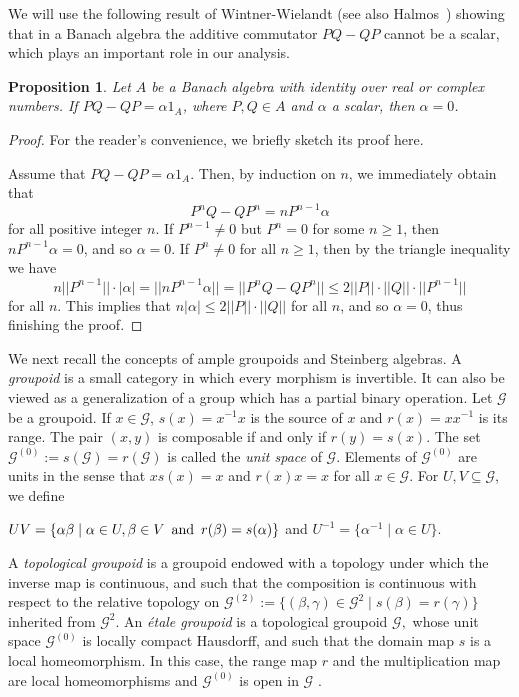 \documentclass[a4paper, 11pt, reqno]{amsart}
\newtheorem{prop}[thm]{Proposition}
\theoremstyle{definition}
\begin{document}
We will use the following result of Wintner-Wielandt \cite{Wielandt} (see also Halmos~\cite[Chapter~24]{halmos}) showing that in a Banach algebra the additive commutator $PQ-QP$ cannot be a scalar, which plays an important role in our analysis. 

\begin{prop}\label{wielandt}
Let $A$ be a Banach algebra with identity over real or complex numbers. If $PQ - QP= \alpha 1_A$, where $P,Q\in A$ and $\alpha $ a scalar, then $\alpha  = 0$. 
\end{prop}
\begin{proof}
For the reader's convenience, we briefly sketch its proof here. 

Assume that $PQ - QP= \alpha 1_A$. Then, by induction on $n$, we immediately obtain that $$P^n Q - QP^n = n P^{n-1}\alpha$$ for all positive integer $n$. If $P^{n-1}\neq 0$ but $P^n=0$ for some $n \ge 1$, then $n P^{n-1}\alpha =0$, and so $\alpha =0$. If $P^n \neq 0$ for all $n\ge 1$, then by the triangle inequality we have $$n||P^{n-1}||\cdot |\alpha| = ||n P^{n-1}\alpha|| = ||P^n Q - QP^n||\le 2 ||P||\cdot ||Q||\cdot ||P^{n-1}||$$ for all $n$. This implies that $n|\alpha| \le 2||P||\cdot ||Q||$ for all $n$, and so $\alpha =0$, thus finishing the proof.
\end{proof}


We next recall the concepts of ample groupoids and Steinberg algebras. A \textit{groupoid} is a small category in which every morphism is invertible. It can also be viewed as a generalization of a group which has a partial binary operation. 
Let $\mathcal{G}$ be a groupoid. If $x \in \mathcal{G}$, $s(x) = x^{-1}x$ is the source of $x$ and $r(x) = xx^{-1}$ is its range. The pair $(x,y)$ is composable if and only if $r(y) = s(x)$. The set $\mathcal{G}^{(0)}:= s(\mathcal{G}) = r(\mathcal{G})$ is called the \textit{unit space} of $\mathcal{G}$. Elements of $\mathcal{G}^{(0)}$ are units in the sense that $xs(x) = x$ and
$r(x)x = x$ for all $x\in \mathcal{G}$. For $U, V \subseteq \mathcal{G}$, we define
\begin{center}
	$UV = \{\alpha\beta \mid \alpha\in U, \beta\in V \text{\, and \,} r(\beta) = s(\alpha)\}$ and $U^{-1} = \{\alpha^{-1}\mid \alpha\in U\}$.
\end{center}

A \textit{topological groupoid} is a groupoid endowed with a topology under which the inverse map is continuous, and such that the composition is continuous with respect to the relative topology on $\mathcal{G}^{(2)} := \{(\beta, \gamma)\in \mathcal{G}^2\mid s(\beta) = r(\gamma)\}$ inherited from $\mathcal{G}^2$. An \textit{\'{e}tale groupoid} is a topological groupoid $\mathcal{G},$ whose unit space  $\mathcal{G}^{(0)}$ is locally compact Hausdorff, and such that 
the domain map $s$ is a local homeomorphism. In this case, the range map $r$ and the multiplication map are local homeomorphisms and  $\mathcal{G}^{(0)}$ is open in $\mathcal{G}$ \cite{r:egatq}. 
\end{document}
